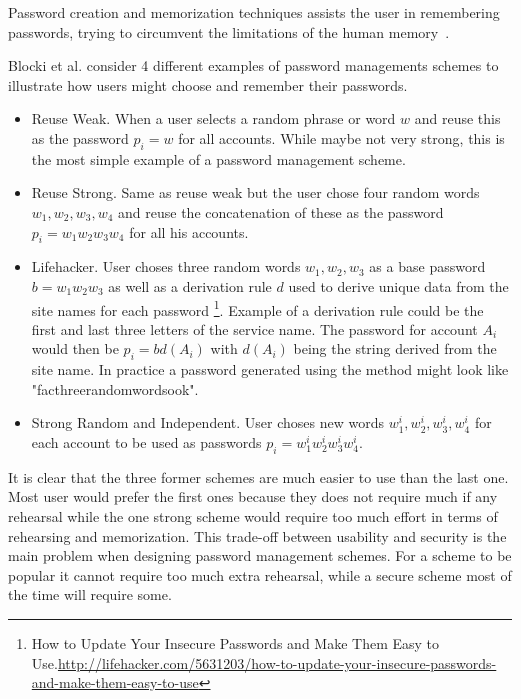Password creation and memorization techniques assists the user in remembering passwords, trying to circumvent the limitations of the human memory~\cite{human-memory}. 
\par Blocki et al. \cite{naturally-rehearsing} consider 4 different examples of password managements schemes to illustrate how users might choose and remember their passwords.
\begin{itemize}
    \item{ Reuse Weak. } When a user selects a random phrase or word $w$ and reuse this as the password $p_i=w$ for all accounts. While maybe not very strong, this is the most simple example of a password management scheme.
    \item{ Reuse Strong. } Same as reuse weak but the user chose four random words $w_1,w_2,w_3,w_4$ and reuse the concatenation of these as the password $p_i = w_1w_2w_3w_4$ for all his accounts.
    \item{Lifehacker.} User choses three random words $w_1, w_2, w_3$ as a base password $b=w_1w_2w_3$ as well as a derivation rule $d$ used to derive unique data from the site names for each password \footnote{How to Update Your Insecure Passwords and Make Them Easy to Use.\url{http://lifehacker.com/5631203/how-to-update-your-insecure-passwords-and-make-them-easy-to-use}}. Example of a derivation rule could be the first and last three letters of the service name. The password for account $A_i$ would then be $p_i = b d(A_i)$ with $d(A_i)$ being the string derived from the site name. In practice a password generated using the method might look like "facthreerandomwordsook". 
    \item{Strong Random and Independent.} User choses new words $w^i_1, w^i_2, w^i_3, w^i_4$ for each account to be used as passwords $p_i = w^i_1w^i_2w^i_3w^i_4$.
\end{itemize}
It is clear that the three former schemes are much easier to use than the last one. Most user would prefer the first ones because they does not require much if any rehearsal while the one strong scheme would require too much effort in terms of rehearsing and memorization. This trade-off between usability and security is the main problem when designing password management schemes. For a scheme to be popular it cannot require too much extra rehearsal, while a secure scheme most of the time will require some.



